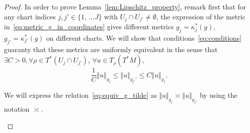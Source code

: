 \documentclass[AHL,Unicode,longabstracts,published]{cedram}
\let\oldexists\exists
\renewcommand*{\exists}{\mathrel{\oldexists}}
\let\oldforall\forall
\renewcommand*{\forall}{\mathrel{\oldforall}}
\begin{document}
\begin{proof}
In order to prove Lemma~\ref{lem:Lipschitz_property}, remark first that for any chart indices $j,j'\in\{1,\,\ldots J\} $ with $U_{j}\cap U_{j'}\neq\emptyset$, the expression of the metric in~\eqref{eq:metric_g_in_coordinates} gives different metrics $g_{j}=\kappa_{j}^{*}(g)$, $g_{j'}=\kappa_{j'}^{*}(g)$ on different charts. We will show that conditions~\eqref{eq:conditions} guaranty that these metrics are uniformly equivalent in the sense that $\exists C>0,\forall\rho\in T^{*}(U_{j}\cap U_{j'})$, $\forall u\in T_{\rho}(T^{*}M)$,
\begin{equation}\label{eq:equiv_g_tilde}
\frac{1}{C}\left\Vert u\right\Vert _{g_{j}}\leq\left\Vert u\right\Vert _{g_{j'}'}\leq C\left\Vert u\right\Vert _{g_{j}}.
\end{equation}

\begin{rema}\label{rem:asympt}
We will express the relation~\eqref{eq:equiv_g_tilde} as $\Vert u\Vert _{g_{j}}\asymp\Vert u\Vert _{g_{j'}}$ by using the notation $\asymp$.
\end{rema}


\end{proof}
\end{document}
